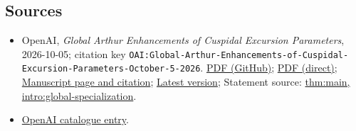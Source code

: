 \documentclass[11pt]{article}
\begin{document}
\subsection{Sources}
\begin{itemize}
\item OpenAI, \emph{Global Arthur Enhancements of Cuspidal Excursion Parameters}, 2026-10-05; citation key \texttt{OAI:Global-Arthur-Enhancements-of-Cuspidal-Excursion-Parameters-October-5-2026}. \href{https://github.com/openai/math/blob/adc7f1241b42e322a6451854ab7e4b4c146bf78a/preprints/Global-Arthur-Enhancements-of-Cuspidal-Excursion-Parameters-October-5-2026/manuscript.pdf}{PDF (GitHub)}; \href{https://github.com/openai/math/raw/adc7f1241b42e322a6451854ab7e4b4c146bf78a/preprints/Global-Arthur-Enhancements-of-Cuspidal-Excursion-Parameters-October-5-2026/manuscript.pdf}{PDF (direct)}; \href{https://github.com/openai/math/blob/adc7f1241b42e322a6451854ab7e4b4c146bf78a/preprints/Global-Arthur-Enhancements-of-Cuspidal-Excursion-Parameters-October-5-2026/README.md}{Manuscript page and citation}; \href{https://github.com/openai/math/blob/main/preprints/Global-Arthur-Enhancements-of-Cuspidal-Excursion-Parameters-October-5-2026/manuscript.pdf}{Latest version}; Statement source: \href{https://github.com/openai/math/blob/adc7f1241b42e322a6451854ab7e4b4c146bf78a/preprints/Global-Arthur-Enhancements-of-Cuspidal-Excursion-Parameters-October-5-2026/build/manuscript.tex\#L180}{thm:main, intro:global-specialization}.
\item \href{https://github.com/openai/math/blob/adc7f1241b42e322a6451854ab7e4b4c146bf78a/CONTENTS.md}{OpenAI catalogue entry}.
\end{itemize}
\end{document}
